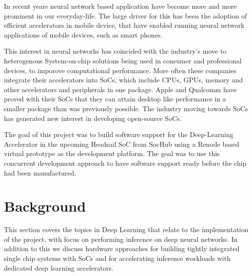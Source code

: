 \documentclass[12pt,a4paper,english
]{tunithesis}
\begin{document}
In recent years neural network based application have become more and more prominent in our everyday-life. The large driver for this has been the adoption of efficient accelerators in mobile device, that have enabled running neural network applications of mobile devices, such as smart phones.

This interest in neural networks has coincided with the industry's move to heterogenous System-on-chip solutions being used in consumer and professional devices, to imporove computational performance.
More often these companies integrate their accelerators into SoCs, which include CPUs, GPUs, memory and other accelerators and peripherals in one package. Apple and Qualcomm have proved with their SoCs that they can attain desktop like performance in a smaller package than was previously possible. The industry moving towards SoCs has generated new interest in developing open-source SoCs.

The goal of this project was to build software support for the Deep-Learning Accelerator in the upcoming Headsail SoC from SocHub using a Renode based virtual prototype as the development platform. The goal was to use this concurrent development approach to have software support ready before the chip had been manufactured.

\chapter{Background}
This section covers the topics in Deep Learning that relate to the implementation of the project, with focus on performing inference on deep neural networks. In addition to this we discuss hardware approaches for building tightly integrated single chip systems with SoCs and for accelerating inference workloads with dedicated deep learning accelerators.
\label{ch:background}
\end{document}
